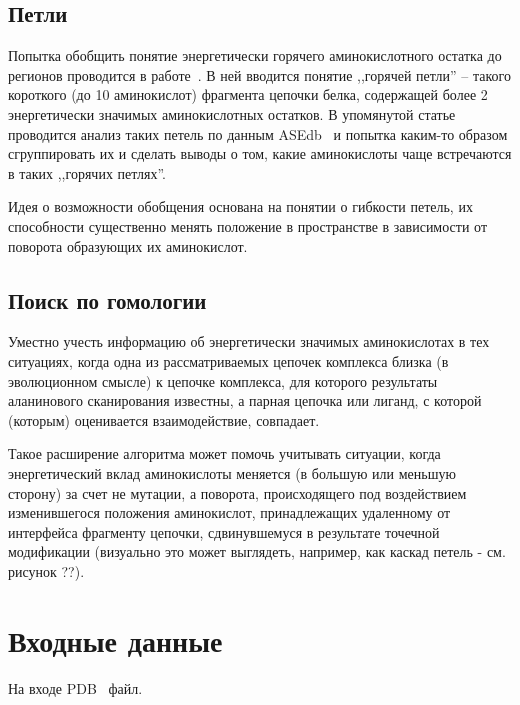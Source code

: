 \subsection{Петли}
Попытка обобщить понятие энергетически горячего аминокислотного остатка до регионов проводится в работе~\cite{loops2014}. В ней вводится понятие ,,горячей петли'' -- такого короткого (до 10 аминокислот) фрагмента  цепочки белка, содержащей более 2 энергетически значимых аминокислотных остатков. В упомянутой статье проводится анализ таких петель по данным ASEdb~\cite{asedb2001} и попытка каким-то образом сгруппировать их и сделать выводы о том, какие аминокислоты чаще встречаются в таких ,,горячих петлях''.

Идея о возможности обобщения основана на понятии о гибкости петель, их способности существенно менять положение в пространстве в зависимости от поворота образующих их аминокислот.

\subsection{Поиск по гомологии}
Уместно учесть информацию об энергетически значимых аминокислотах в тех ситуациях, когда одна из рассматриваемых цепочек комплекса близка (в эволюционном смысле) к цепочке комплекса, для которого результаты аланинового сканирования известны, а парная цепочка или лиганд, с которой (которым) оценивается взаимодействие, совпадает.

Такое расширение алгоритма может помочь учитывать ситуации, когда энергетический вклад аминокислоты меняется (в большую или меньшую сторону) за счет не мутации, а поворота, происходящего под воздействием изменившегося положения аминокислот, принадлежащих удаленному от интерфейса фрагменту цепочки, сдвинувшемуся в результате точечной модификации (визуально это может выглядеть, например, как каскад петель - см. рисунок ??). 
\section{Входные данные}

На входе PDB~\cite{pdb} файл.


